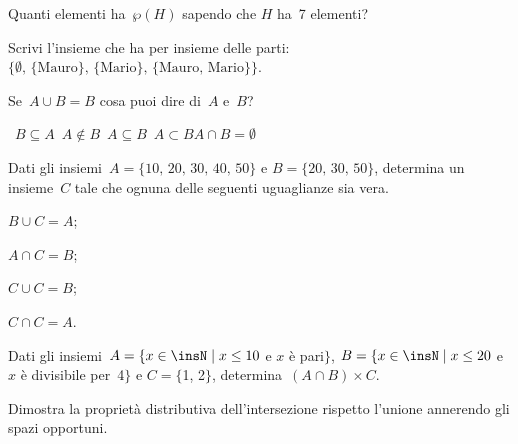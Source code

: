 \begin{esercizio}[\Ast]
\label{ese:5.120}
Quanti elementi ha~$\wp (H)$ sapendo che $H$ ha~7 elementi?
\end{esercizio}

\begin{esercizio}
\label{ese:5.121}
Scrivi l'insieme che ha per insieme delle parti:
$\{\emptyset\text{, }\{\text{Mauro}\}\text{, }\{\text{Mario}\}\text{, }\{\text{Mauro, Mario}\}\}$.
\end{esercizio}

\begin{esercizio}[\Ast]
\label{ese:5.122}
Se~$A\cup B=B$ cosa puoi dire di~$A$ e~$B$?
\begin{center}
 \boxA\quad~$B\subseteq A$\quad\boxB\quad~$A\notin B$\quad\boxC\quad~$A\subseteq B$\quad\boxD\quad~$A\subset B$\quad\boxE\quad$A\cap B=\emptyset $
\end{center}
\end{esercizio}

\begin{esercizio}
\label{ese:5.123}
Dati gli insiemi~$A=\{\text{10, 20, 30, 40, 50}\}$ e $B=\{\text{20, 30, 50}\}$,
determina un insieme~$C$ tale che ognuna delle seguenti uguaglianze sia vera.
\begin{multicols}{4}
\begin{enumeratea}
 \item $B\cup C=A$;
 \item $A\cap C=B$;
 \item $C\cup C=B$;
 \item $C\cap C=A$.
\end{enumeratea}
\end{multicols}
\end{esercizio}

\begin{esercizio}
\label{ese:5.124}
Dati gli insiemi~$A=\{x\in\insN\mid x\le 10$ e $x$ è pari$\}$,
$B=\{x\in\insN\mid x\le 20$ e $x$ è divisibile per~4$\}$ e
$C=\{$1, 2$\}$, determina~$(A\cap B)\times C$.
\end{esercizio}

\begin{esercizio}
\label{ese:5.125}
Dimostra la proprietà distributiva dell'intersezione rispetto l'unione annerendo gli spazi opportuni.
\begin{center}
 
\end{center}
\end{esercizio}

